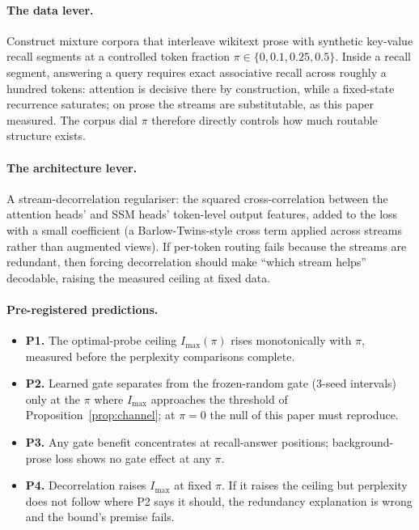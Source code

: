 \documentclass[11pt,a4paper]{article}
\begin{document}
\paragraph{The data lever.} Construct mixture corpora that interleave
wikitext prose with synthetic key-value recall segments at a controlled
token fraction $\pi \in \{0, 0.1, 0.25, 0.5\}$. Inside a recall segment,
answering a query requires exact associative recall across roughly a
hundred tokens: attention is decisive there by construction, while a
fixed-state recurrence saturates; on prose the streams are substitutable,
as this paper measured. The corpus dial $\pi$ therefore directly
controls how much routable structure exists.

\paragraph{The architecture lever.} A stream-decorrelation regulariser:
the squared cross-correlation between the attention heads' and SSM heads'
token-level output features, added to the loss with a small coefficient
(a Barlow-Twins-style cross term applied across streams rather than
augmented views). If per-token routing fails because the streams are
redundant, then forcing decorrelation should make ``which stream helps''
decodable, raising the measured ceiling at fixed data.

\paragraph{Pre-registered predictions.}
\begin{itemize}
\item \textbf{P1.} The optimal-probe ceiling $I_{\max}(\pi)$ rises
      monotonically with $\pi$, measured before the perplexity
      comparisons complete.
\item \textbf{P2.} Learned gate separates from the frozen-random gate
      (3-seed intervals) only at the $\pi$ where $I_{\max}$ approaches
      the threshold of Proposition~\ref{prop:channel}; at $\pi = 0$ the
      null of this paper must reproduce.
\item \textbf{P3.} Any gate benefit concentrates at recall-answer
      positions; background-prose loss shows no gate effect at any
      $\pi$.
\item \textbf{P4.} Decorrelation raises $I_{\max}$ at fixed $\pi$. If it
      raises the ceiling but perplexity does not follow where P2 says it
      should, the redundancy explanation is wrong and the bound's
      premise fails.
\end{itemize}
\end{document}
